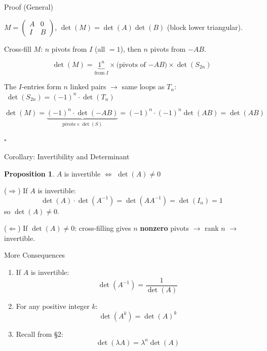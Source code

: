 \documentclass[10pt]{beamer}
\theoremstyle{definition}
\newtheorem{prop}{Proposition}[section]
\newcommand{\x}[1]{\alert{\textbf{#1}}}
\begin{document}
\begin{frame}{Proof (General)}

$M = \begin{pmatrix} A & 0 \\ I & B \end{pmatrix}$, \; $\det(M) = \det(A)\det(B)$ \; (block lower triangular).

\vfill

Cross-fill $M$: $n$ pivots from $I$ (all $= 1$), then $n$ pivots from $-AB$.

$$\det(M) = \underbrace{1^n}_{\text{from } I} \times \text{(pivots of }{-AB}\text{)}  \times \det(S_{2n})$$

The $I$-entries form $n$ linked pairs $\to$ same loops as $T_n$:
$\;\det(S_{2n}) = (-1)^n \cdot \det(T_n)$

\vfill

$$\det(M) = \underbrace{(-1)^n \cdot \det(-AB)}_{\text{pivots}\times\det(S)} = (-1)^n \cdot (-1)^n \det(AB) = \det(AB)$$

\vfill

\begin{center}
 \quad $\square$
\end{center}

\end{frame}


\begin{frame}{Corollary: Invertibility and Determinant}

\begin{prop}
$A$ is invertible $\iff$ $\det(A) \neq 0$
\end{prop}

\vfill

($\Rightarrow$) \; If $A$ is invertible:
$$\det(A)\cdot\det(A^{-1}) = \det(AA^{-1}) = \det(I_n) = 1$$
so $\det(A) \neq 0$.

\vfill

($\Leftarrow$) \; If $\det(A) \neq 0$: cross-filling gives $n$ \x{nonzero} pivots $\to$ rank $n$ $\to$ invertible.

\end{frame}


\begin{frame}{More Consequences}

\begin{enumerate}
\item If $A$ is invertible:
$$\det(A^{-1}) = \frac{1}{\det(A)}$$

\vfill

\item For any positive integer $k$:
$$\det(A^k) = \det(A)^k$$

\vfill

\item Recall from \S2:
$$\det(\lambda A) = \lambda^n \det(A)$$
\end{enumerate}

\end{frame}
\end{document}
